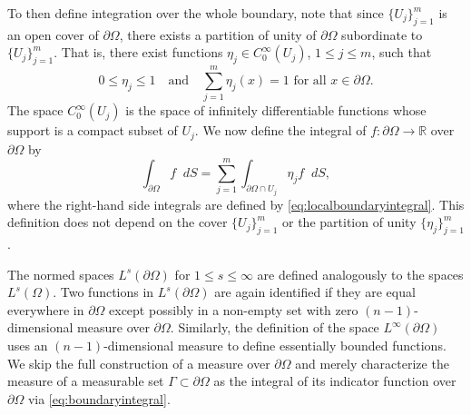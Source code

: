 \documentclass[english, 12pt, a4paper, sci, utf8, a-2b, online]{aaltothesis}
\theoremstyle{definition}
\theoremstyle{plain}
\newcommand*\diff{\mathop{}\!d}
\numberwithin{equation}{section}
\begin{document}
To then define integration over the whole boundary, note that since
$\{ U_j \}_{j=1}^{m}$ is an open cover of $\partial \Omega$, there exists
a partition of unity of $\partial \Omega$ subordinate to $\{ U_j \}_{j=1}^{m}$. 
That is, there exist functions $\eta_j \in C_0^{\infty}(U_j)$,
$1 \leq j \leq m$, such that
\begin{equation*}
    0 \leq \eta_j \leq 1
    \quad \text{and} \quad
    \sum_{j=1}^{m} \eta_j(x) = 1 \text{ for all } x \in \partial \Omega.
\end{equation*}
The space $C_0^{\infty}(U_j)$ is the space of infinitely differentiable functions
whose support is a compact subset of $U_j$.
We now define the integral of $f: \partial \Omega \to \mathbb{R}$ over $\partial \Omega$ by
\begin{equation}
    \label{eq:boundaryintegral}
    \int_{\partial \Omega} f \diff S
    = \sum_{j=1}^{m} \int_{\partial \Omega \cap U_j} \eta_j f \diff S,
\end{equation}
where the right-hand side integrals are defined by \eqref{eq:localboundaryintegral}.
This definition does not depend on the cover $\{ U_j \}_{j=1}^{m}$
or the partition of unity $\{ \eta_j \}_{j=1}^{m}$ \cite{necas2011}.

The normed spaces $L^s(\partial \Omega)$ for $1 \leq s \leq \infty$ are defined
analogously to the spaces $L^s(\Omega)$. Two functions in $L^s(\partial \Omega)$
are again identified if they are equal everywhere in $\partial \Omega$ except
possibly in a non-empty set with zero $(n-1)$-dimensional measure over
$\partial \Omega$. Similarly, the definition of the space $L^{\infty}(\partial 
\Omega)$ uses an $(n-1)$-dimensional measure to define essentially bounded
functions. We skip the full construction of a measure over $\partial \Omega$
and merely characterize the measure of a measurable
set $\Gamma \subset \partial \Omega$ as the integral of its indicator
function over $\partial \Omega$ via \eqref{eq:boundaryintegral}.
\end{document}
